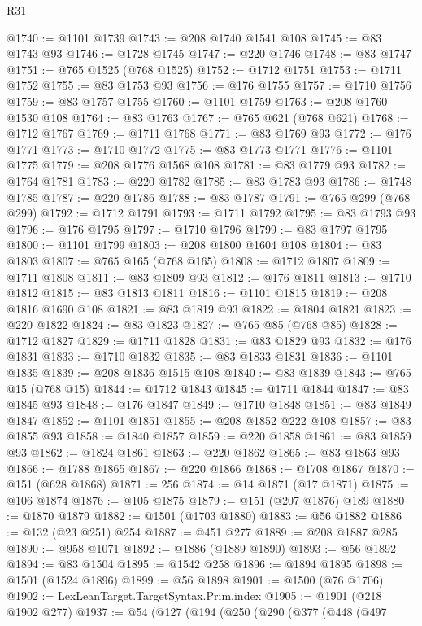 \begin{lexlean}{R31}
\begin{coremodule}
@1740 := @1101 @1739
@1743 := @208 @1740 @1541 @108
@1745 := @83 @1743 @93
@1746 := @1728 @1745
@1747 := @220 @1746
@1748 := @83 @1747
@1751 := @765 @1525 (@768 @1525)
@1752 := @1712 @1751
@1753 := @1711 @1752
@1755 := @83 @1753 @93
@1756 := @176 @1755
@1757 := @1710 @1756
@1759 := @83 @1757 @1755
@1760 := @1101 @1759
@1763 := @208 @1760 @1530 @108
@1764 := @83 @1763
@1767 := @765 @621 (@768 @621)
@1768 := @1712 @1767
@1769 := @1711 @1768
@1771 := @83 @1769 @93
@1772 := @176 @1771
@1773 := @1710 @1772
@1775 := @83 @1773 @1771
@1776 := @1101 @1775
@1779 := @208 @1776 @1568 @108
@1781 := @83 @1779 @93
@1782 := @1764 @1781
@1783 := @220 @1782
@1785 := @83 @1783 @93
@1786 := @1748 @1785
@1787 := @220 @1786
@1788 := @83 @1787
@1791 := @765 @299 (@768 @299)
@1792 := @1712 @1791
@1793 := @1711 @1792
@1795 := @83 @1793 @93
@1796 := @176 @1795
@1797 := @1710 @1796
@1799 := @83 @1797 @1795
@1800 := @1101 @1799
@1803 := @208 @1800 @1604 @108
@1804 := @83 @1803
@1807 := @765 @165 (@768 @165)
@1808 := @1712 @1807
@1809 := @1711 @1808
@1811 := @83 @1809 @93
@1812 := @176 @1811
@1813 := @1710 @1812
@1815 := @83 @1813 @1811
@1816 := @1101 @1815
@1819 := @208 @1816 @1690 @108
@1821 := @83 @1819 @93
@1822 := @1804 @1821
@1823 := @220 @1822
@1824 := @83 @1823
@1827 := @765 @85 (@768 @85)
@1828 := @1712 @1827
@1829 := @1711 @1828
@1831 := @83 @1829 @93
@1832 := @176 @1831
@1833 := @1710 @1832
@1835 := @83 @1833 @1831
@1836 := @1101 @1835
@1839 := @208 @1836 @1515 @108
@1840 := @83 @1839
@1843 := @765 @15 (@768 @15)
@1844 := @1712 @1843
@1845 := @1711 @1844
@1847 := @83 @1845 @93
@1848 := @176 @1847
@1849 := @1710 @1848
@1851 := @83 @1849 @1847
@1852 := @1101 @1851
@1855 := @208 @1852 @222 @108
@1857 := @83 @1855 @93
@1858 := @1840 @1857
@1859 := @220 @1858
@1861 := @83 @1859 @93
@1862 := @1824 @1861
@1863 := @220 @1862
@1865 := @83 @1863 @93
@1866 := @1788 @1865
@1867 := @220 @1866
@1868 := @1708 @1867
@1870 := @151 (@628 @1868)
@1871 := 256
@1874 := @14 @1871 (@17 @1871)
@1875 := @106 @1874
@1876 := @105 @1875
@1879 := @151 (@207 @1876) @189
@1880 := @1870 @1879
@1882 := @1501 (@1703 @1880)
@1883 := @56 @1882
@1886 := @132 (@23 @251) @254
@1887 := @451 @277
@1889 := @208 @1887 @285
@1890 := @958 @1071
@1892 := @1886 (@1889 @1890)
@1893 := @56 @1892
@1894 := @83 @1504
@1895 := @1542 @258
@1896 := @1894 @1895
@1898 := @1501 (@1524 @1896)
@1899 := @56 @1898
@1901 := @1500 (@76 @1706)
@1902 := LexLeanTarget.TargetSyntax.Prim.index
@1905 := @1901 (@218 @1902 @277)
@1937 := @54
    (@127
      (@194
        (@250
          (@290
            (@377
              (@448
                (@497

\end{coremodule}
\end{lexlean}
